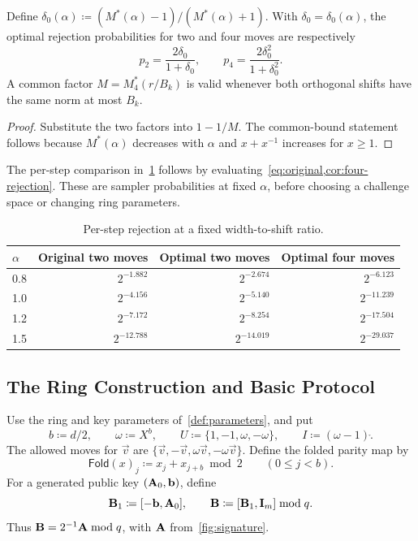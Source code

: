 \begin{corollary}
\label{cor:four-rejection}
Define $\delta_0(\alpha)\coloneqq(M^*(\alpha)-1)/(M^*(\alpha)+1)$. With $\delta_0=\delta_0(\alpha)$, the optimal rejection probabilities for two and four moves are respectively
\[
 p_2=\frac{2\delta_0}{1+\delta_0},\qquad
 p_4=\frac{2\delta_0^2}{1+\delta_0^2}.
\]
A common factor $M=M_4^*(r/B_k)$ is valid whenever both orthogonal shifts have the same norm at most $B_k$.
\end{corollary}
\begin{proof}
Substitute the two factors into $1-1/M$. The common-bound statement follows because $M^*(\alpha)$ decreases with $\alpha$ and $x+x^{-1}$ increases for $x\ge1$.
\end{proof}

The per-step comparison in~\cref{tab:four-rates} follows by evaluating~\cref{eq:original,cor:four-rejection}. These are sampler probabilities at fixed $\alpha$, before choosing a challenge space or changing ring parameters.

\begin{table}[!htbp]
\centering
\begin{tabular}{lrrr}
\toprule
$\alpha$ & Original two moves & Optimal two moves & Optimal four moves\\
\midrule
0.8 & $2^{-1.882}$ & $2^{-2.674}$ & $2^{-6.123}$\\
1.0 & $2^{-4.156}$ & $2^{-5.140}$ & $2^{-11.239}$\\
1.2 & $2^{-7.172}$ & $2^{-8.254}$ & $2^{-17.504}$\\
1.5 & $2^{-12.788}$ & $2^{-14.019}$ & $2^{-29.037}$\\
\bottomrule
\end{tabular}
\caption{Per-step rejection at a fixed width-to-shift ratio.}
\label{tab:four-rates}
\end{table}

\subsection{The Ring Construction and Basic Protocol}

\begin{definition}
\label{def:unit-family}
Use the ring and key parameters of~\cref{def:parameters}, and put
\[
 b\coloneqq d/2,\qquad \omega\coloneqq X^b,\qquad
 U\coloneqq\{1,-1,\omega,-\omega\},\qquad I\coloneqq(\omega-1)\ring.
\]
The allowed moves for $\vec v$ are $\{\vec v,-\vec v,\omega\vec v,-\omega\vec v\}$. Define the folded parity map by
\begin{equation}
\label{eq:fold}
 \mathsf{Fold}(x)_j\coloneqq x_j+x_{j+b}\bmod2
 \qquad(0\le j<b).
\end{equation}
For a generated public key $(\mathbf{A}_0,\mathbf{b})$, define
\[
 \mathbf{B}_1\coloneqq[-\mathbf{b},\mathbf{A}_0],\qquad
 \mathbf{B}\coloneqq[\mathbf{B}_1,\mathbf{I}_m]\bmod q.
\]
Thus $\mathbf{B}=2^{-1}\mathbf{A}\bmod q$, with $\mathbf{A}$ from~\cref{fig:signature}.
\end{definition}

